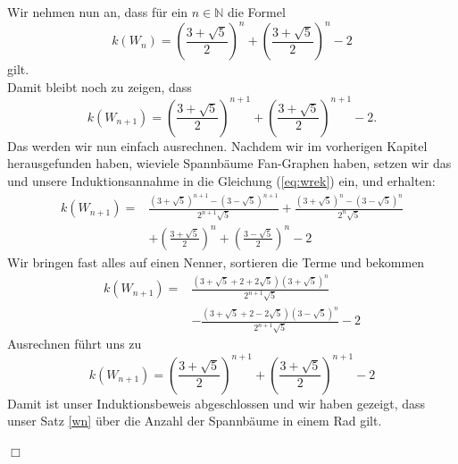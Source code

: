 Wir nehmen nun an, dass für ein $n \in \mathbb{N}$ die Formel 
\begin{equation}
 \mathit{k}\left(W_n\right) = \left(\frac{3+\sqrt{5}}{2}\right)^n+\left(\frac{3+\sqrt{5}}{2}\right)^n-2
\end{equation}
gilt.\\
Damit bleibt noch zu zeigen, dass
\begin{equation}
 \mathit{k}\left(W_{n+1}\right) = \left(\frac{3+\sqrt{5}}{2}\right)^{n+1}+\left(\frac{3+\sqrt{5}}{2}\right)^{n+1}-2.
\end{equation}
Das werden wir nun einfach ausrechnen.
Nachdem wir im vorherigen Kapitel herausgefunden haben, wieviele Spannbäume Fan-Graphen haben, setzen wir das und unsere Induktionsannahme in die Gleichung (\ref{eq:wrek}) ein, und erhalten:\\
\begin{equation}
\begin{aligned}
\mathit{k}\left(W_{n+1}\right) ={} & \frac{\left(3+\sqrt{5}\right)^{n+1}-\left(3-\sqrt{5}\right)^{n+1}}{2^{n+1}\sqrt{5}} + \frac{\left(3+\sqrt{5}\right)^{n}-\left(3-\sqrt{5}\right)^{n}}{2^{n}\sqrt{5}}\\
& + \left(\frac{3+\sqrt{5}}{2}\right)^n+\left(\frac{3-\sqrt{5}}{2}\right)^n-2
\end{aligned}
\end{equation}
Wir bringen fast alles auf einen Nenner, sortieren die Terme und bekommen
\begin{equation}
\begin{aligned}
\mathit{k}\left(W_{n+1}\right) = {}  & \frac{\left(3+\sqrt{5}+2+2\sqrt{5}\right)\left(3+\sqrt{5}\right)^{n}}{2^{n+1}\sqrt{5}} \\%
                        & -\frac{\left(3+\sqrt{5}+2-2\sqrt{5}\right)\left(3-\sqrt{5}\right)^{n}}{2^{n+1}\sqrt{5}}-2 
\end{aligned}
\end{equation}
Ausrechnen führt uns zu\\
\begin{equation}
\mathit{k}\left(W_{n+1}\right) = \left(\frac{3+\sqrt{5}}{2}\right)^{n+1}+\left(\frac{3+\sqrt{5}}{2}\right)^{n+1}-2
\end{equation}
Damit ist unser Induktionsbeweis abgeschlossen und wir haben gezeigt, dass unser Satz \ref{wn} über die Anzahl der Spannbäume in einem Rad gilt.
\begin{flushright} $\Box$ \end{flushright} 
